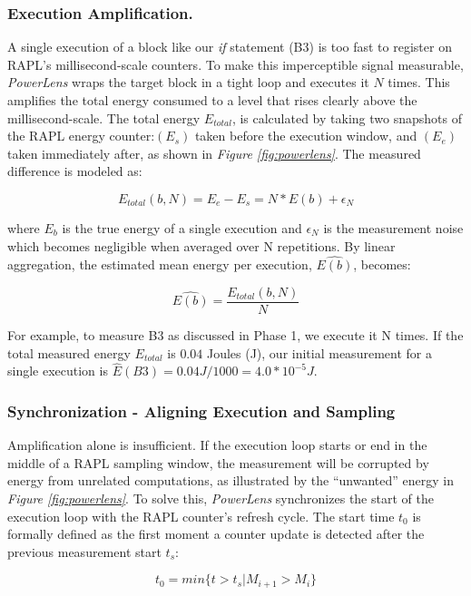 \subsubsection{Execution Amplification.}

A single execution of a block like our \textit{if} statement (B3) is too fast to register on RAPL's millisecond-scale counters. To make this imperceptible signal measurable, \textit{PowerLens} wraps the target block in a tight loop and executes it \( N \) times. This amplifies the total energy consumed to a level that rises clearly above the millisecond-scale. The total energy \( E_{total} \), is calculated by taking two snapshots of the RAPL energy counter:\( (E_s) \) taken before the execution window, and \( (E_e) \) taken immediately after, as shown in \textit{Figure \ref{fig:powerlens}}. The measured difference is modeled as: 

\[ E_{total}(b, N) = E_e - E_s = N * E(b) + \epsilon_N \]

where \( E_b \) is the true energy of a single execution and \( \epsilon_N \) is the measurement noise which becomes negligible when averaged over N repetitions. By linear aggregation, the estimated mean energy per execution, \( \hat{E(b)} \), becomes:

\[ \hat{E(b)} = \frac{E_{total}(b,N)}{N} \]

For example, to measure B3 as discussed in Phase 1, we execute it N times. If the total measured energy \( E_{total} \) is \( 0.04 \) Joules (J), our initial measurement for a single execution is \( \hat{E}(B3) = 0.04 J / 1000 = 4.0 * 10^{-5} J \). 

\subsubsection{Synchronization - Aligning Execution and Sampling}

Amplification alone is insufficient. If the execution loop starts or end in the middle of a RAPL sampling window, the measurement will be corrupted by energy from unrelated computations, as illustrated by the “unwanted” energy in \textit{Figure \ref{fig:powerlens}}. To solve this, \textit{PowerLens} synchronizes the start of the execution loop with the RAPL counter's refresh cycle.  The start time \( t_0 \) is formally defined as the first moment a counter update is detected after the previous measurement start \( t_s \):

\[ t_0 = min\{ t > t_s | M_{i+1} > M_i \} \]

